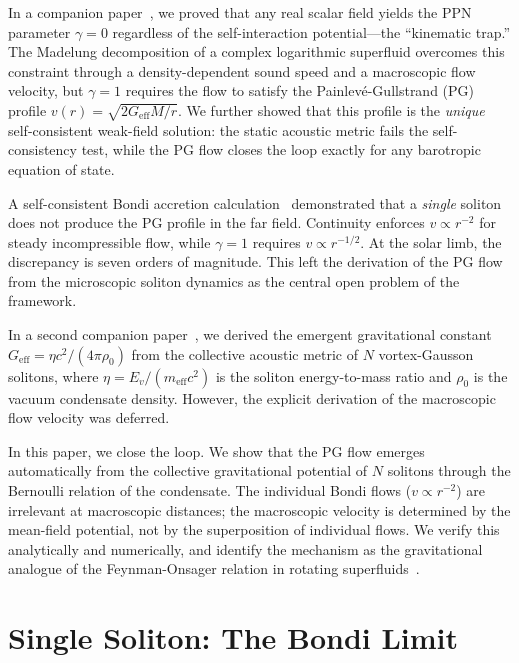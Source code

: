 \documentclass[12pt, a4paper]{article}
\newcommand{\Geff}{G_{\mathrm{eff}}}
\newcommand{\meff}{m_{\mathrm{eff}}}
\begin{document}
In a companion paper~\cite{kulangiev_2026a}, we proved
that any real scalar field yields the PPN parameter
$\gamma = 0$ regardless of the self-interaction
potential---the ``kinematic trap.'' The Madelung
decomposition of a complex logarithmic superfluid
overcomes this constraint through a density-dependent
sound speed and a macroscopic flow velocity, but
$\gamma = 1$ requires the flow to satisfy the
Painlev\'{e}-Gullstrand (PG) profile
$v(r) = \sqrt{2\Geff M/r}$. We further showed that
this profile is the \emph{unique} self-consistent
weak-field solution: the static acoustic metric fails
the self-consistency test, while the PG flow closes
the loop exactly for any barotropic equation of state.

A self-consistent Bondi accretion
calculation~\cite{kulangiev_2026a} demonstrated that a
\emph{single} soliton does not produce the PG profile
in the far field. Continuity enforces
$v \propto r^{-2}$ for steady incompressible flow,
while $\gamma = 1$ requires $v \propto r^{-1/2}$.
At the solar limb, the discrepancy is seven orders of
magnitude. This left the derivation of the PG flow
from the microscopic soliton dynamics as the central
open problem of the framework.

In a second companion paper~\cite{kulangiev_2026b},
we derived the emergent gravitational constant
$\Geff = \eta c^2/(4\pi\rho_0)$ from the collective
acoustic metric of $N$ vortex-Gausson solitons, where
$\eta = E_v/(\meff c^2)$ is the soliton energy-to-mass
ratio and $\rho_0$ is the vacuum condensate density.
However, the explicit derivation of the macroscopic
flow velocity was deferred.

In this paper, we close the loop. We show that the PG
flow emerges automatically from the collective
gravitational potential of $N$ solitons through the
Bernoulli relation of the condensate. The individual
Bondi flows ($v \propto r^{-2}$) are irrelevant at
macroscopic distances; the macroscopic velocity is
determined by the mean-field potential, not by the
superposition of individual flows. We verify this
analytically and numerically, and identify the
mechanism as the gravitational analogue of the
Feynman-Onsager relation in rotating
superfluids~\cite{feynman_1955,volovik_2003}.


\section{Single Soliton: The Bondi Limit}
\label{sec:single}
\end{document}
